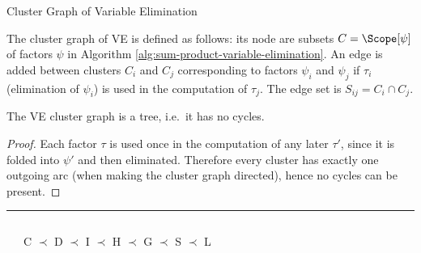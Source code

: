 \begin{frame}{Cluster Graph of Variable Elimination}
\begin{definition}
    The cluster graph of VE is defined as follows: its node are subsets $C = 
    \Scope[\psi]$ of factors $\psi$ in Algorithm \ref{alg:sum-product-variable-elimination}.
    An edge is added between clusters $C_i$ and $C_j$ corresponding to factors $\psi_i$ and $\psi_j$ if $\tau_i$ (elimination of $\psi_i$) is used in the computation of $\tau_j$.
    The edge set is $S_{ij} = C_i \cap C_j$.
\end{definition}
\pause
\begin{theorem}
\label{thm:ve-cluster-graph-tree}
    The VE cluster graph is a tree, i.e.\ it has no cycles.
\end{theorem}
\pause
\begin{proof}
    Each factor $\tau$ is used once in the computation of any later $\tau'$, since it is folded into $\psi'$ and then eliminated.
\pause
Therefore every cluster has exactly one outgoing arc (when making the cluster graph directed), hence no cycles can be present.
\end{proof}
\pause
\hrule
\begin{columns}[T]
\vspace{0.3cm}
\ \ \ C $\prec$ D $\prec$ I $\prec$ H $\prec$ G $\prec$ S $\prec$ L
\begin{center}
\end{center}
\end{columns}
\end{frame}
